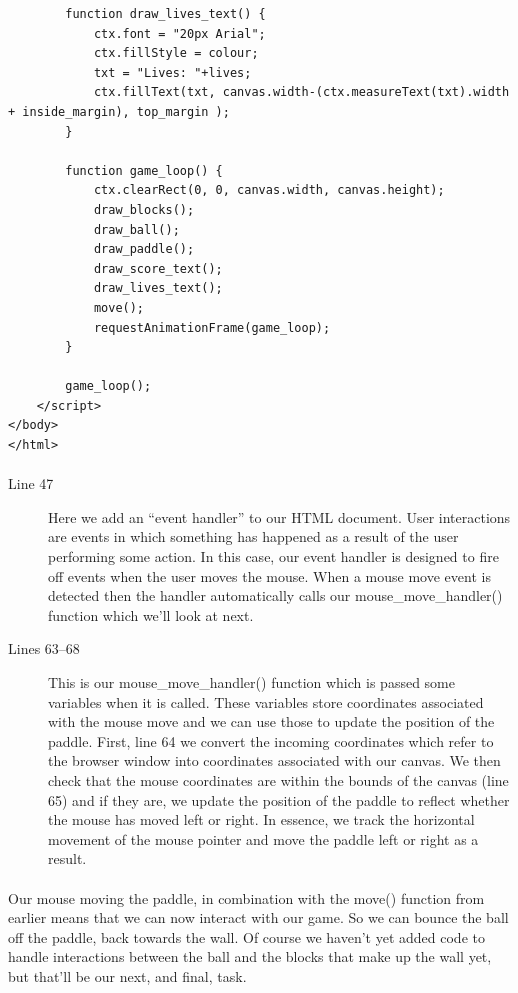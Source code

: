\documentclass[10pt, a4paper, oneside]{article}
\begin{document}
\begin{lstlisting}
        function draw_lives_text() {
            ctx.font = "20px Arial";
            ctx.fillStyle = colour;
            txt = "Lives: "+lives;
            ctx.fillText(txt, canvas.width-(ctx.measureText(txt).width + inside_margin), top_margin );
        }
        
        function game_loop() {
            ctx.clearRect(0, 0, canvas.width, canvas.height);
            draw_blocks();
            draw_ball();
            draw_paddle();
            draw_score_text();
            draw_lives_text();
            move();
            requestAnimationFrame(game_loop);
        }
        
        game_loop();
    </script>
</body>
</html>
\end{lstlisting}

\paragraph{} 

\begin{description}
\item[Line 47] Here we add an ``event handler'' to our HTML document. User interactions are events in which something has happened as a result of the user performing some action. In this case, our event handler is designed to fire off events when the user moves the mouse. When a mouse move event is detected then the handler automatically calls our mouse\_move\_handler() function which we'll look at next.
\item[Lines 63--68] This is our mouse\_move\_handler() function which is passed some variables when it is called. These variables store coordinates associated with the mouse move and we can use those to update the position of the paddle. First, line 64 we convert the incoming coordinates which refer to the browser window into coordinates associated with our canvas. We then check that the mouse coordinates are within the bounds of the canvas (line 65) and if they are, we update the position of the paddle to reflect whether the mouse has moved left or right. In essence, we track the horizontal movement of the mouse pointer and move the paddle left or right as a result.
\end{description}

\paragraph{} Our mouse moving the paddle, in combination with the move() function from earlier means that we can now interact with our game. So we can bounce the ball off the paddle, back towards the wall. Of course we haven't yet added code to handle interactions between the ball and the blocks that make up the wall yet, but that'll be our next, and final, task.
\end{document}
